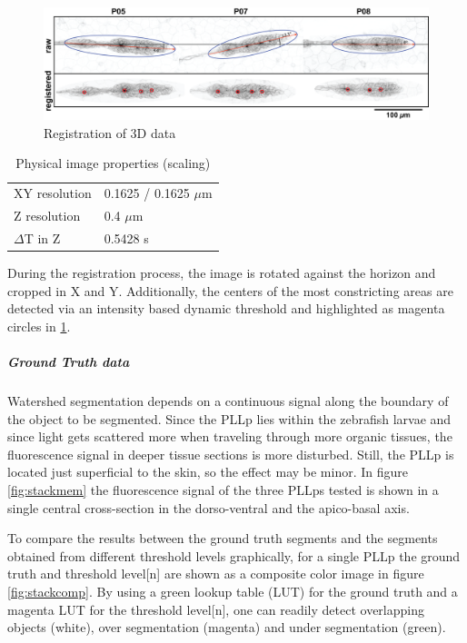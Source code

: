 \documentclass[11pt,singlespacinge,twoside]{reedthesis} %
\begin{document}
\begin{figure}

{\centering \includegraphics[width=0.9\linewidth]{figures/materials/ground_truth/registration} 

}

\caption{Registration of 3D data}\label{fig:maxraw}
\end{figure}
\begin{table}[!h]

\caption{\label{tab:imgprop}Physical image properties (scaling)}
\centering
\begin{tabu} to 
\toprule
{}  XY resolution & 0.1625 / 0.1625 $\mu$m\\
Z resolution & 0.4 $\mu$m\\
  $\Delta$T in Z & 0.5428 s\\
\bottomrule
\end{tabu}
\end{table}
During the registration process, the image is rotated against the horizon and cropped in X and Y. Additionally, the centers of the most constricting areas are detected via an intensity based dynamic threshold and highlighted as magenta circles in \ref{fig:maxraw}.

\hypertarget{ground-truth-data-1}{%
\subparagraph{Ground Truth data}\label{ground-truth-data-1}}

Watershed segmentation depends on a continuous signal along the boundary of the object to be segmented. Since the PLLp lies within the zebrafish larvae and since light gets scattered more when traveling through more organic tissues, the fluorescence signal in deeper tissue sections is more disturbed. Still, the PLLp is located just superficial to the skin, so the effect may be minor. In figure \ref{fig:stackmem} the fluorescence signal of the three PLLps tested is shown in a single central cross-section in the dorso-ventral and the apico-basal axis.

To compare the results between the ground truth segments and the segments obtained from different threshold levels graphically, for a single PLLp the ground truth and threshold level{[}n{]} are shown as a composite color image in figure \ref{fig:stackcomp}. By using a green lookup table (LUT) for the ground truth and a magenta LUT for the threshold level{[}n{]}, one can readily detect overlapping objects (white), over segmentation (magenta) and under segmentation (green).
\end{document}
